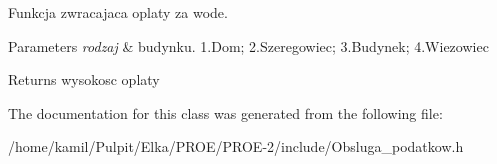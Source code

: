 Funkcja zwracajaca oplaty za wode. 


\begin{DoxyParams}{Parameters}
{\em rodzaj} & budynku. 1.\+Dom; 2.\+Szeregowiec; 3.\+Budynek; 4.\+Wiezowiec \\
\hline
\end{DoxyParams}
\begin{DoxyReturn}{Returns}
wysokosc oplaty 
\end{DoxyReturn}


The documentation for this class was generated from the following file\+:\begin{DoxyCompactItemize}
\item 
/home/kamil/\+Pulpit/\+Elka/\+P\+R\+O\+E/\+P\+R\+O\+E-\/2/include/Obsluga\+\_\+podatkow.\+h\end{DoxyCompactItemize}
